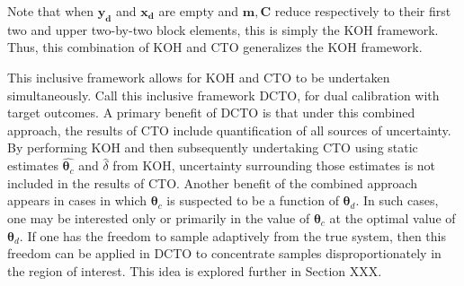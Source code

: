 \documentclass[12pt]{article}
\begin{document}
%
Note that when $\mathbf{y_d}$ and $\mathbf{x_d}$ are empty and $\mathbf m, \mathbf C$ reduce respectively to their first two and upper two-by-two block elements, this is simply the KOH framework.
%
Thus, this combination of KOH and CTO generalizes the KOH framework.
%

%
This inclusive framework allows for KOH and CTO to be undertaken simultaneously.
%
Call this inclusive framework DCTO, for dual calibration with target outcomes.
%
A primary benefit of DCTO is that under this combined approach, the results of CTO include quantification of all sources of uncertainty.
%
By performing KOH and then subsequently undertaking CTO using static estimates $\widehat{\boldsymbol\theta_c}$ and $\widehat \delta$ from KOH, uncertainty surrounding those estimates is not included in the results of CTO.
%
Another benefit of the combined approach appears in cases in which $\boldsymbol\theta_c$ is suspected to be a function of $\boldsymbol\theta_d$.
%
In such cases, one may be interested only or primarily in the value of $\boldsymbol\theta_c$ at the optimal value of $\boldsymbol\theta_d$.
%
If one has the freedom to sample adaptively from the true system, then this freedom can be applied in DCTO to concentrate samples disproportionately in the region of interest.
%
This idea is explored further in Section XXX.
%
\end{document}
